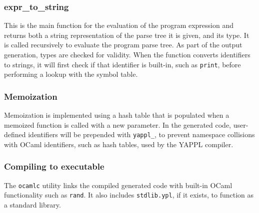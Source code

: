 \subsubsection{expr\_to\_string} 
This is the main function for the evaluation of the program expression and returns both a string representation of the parse tree it is given, and its type. It is called recursively to evaluate the program parse tree. As part of the output generation, types are checked for validity. When the function converts identifiers to strings, it will first check if that identifier is built-in, such as \texttt{print}, before performing a lookup with the symbol table.
\subsubsection{Memoization}
Memoization is implemented using a hash table that is populated when a memoized function is called with a new parameter.  In the generated code, user-defined identifiers will be prepended with \texttt{yappl\_}, to prevent namespace collisions with OCaml identifiers, such as hash tables, used by the YAPPL compiler.
\subsubsection{Compiling to executable}
The \texttt{ocamlc} utility links the compiled generated code with built-in OCaml functionality such as \texttt{rand}. It also includes \texttt{stdlib.ypl}, if it exists, to function as a standard library.